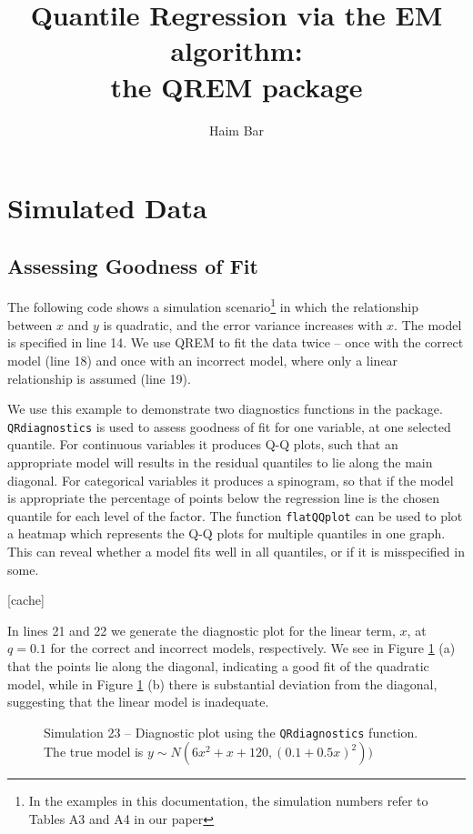 \documentclass[a4paper,10pt]{article}
\title{Quantile Regression via the EM algorithm: \\the QREM package}
\author{Haim Bar}
\begin{document}
\maketitle

\section{Simulated Data}
\subsection{Assessing Goodness of Fit}
The following code shows a simulation scenario\footnote{In the examples in this documentation, the simulation numbers refer to Tables A3 and A4 in our paper} in which the relationship between $x$ and $y$ is quadratic, and the error variance increases with $x$. The model is specified in line 14.
We use QREM to fit the data twice -- once with the correct model (line 18) and once with an incorrect model, where only a linear relationship is assumed (line 19).
 

We use this example to demonstrate two diagnostics functions in the package. \texttt{QRdiagnostics} is used to assess goodness of fit for one variable, at one selected quantile. For continuous variables it produces Q-Q plots, such that an appropriate model will results in the residual quantiles to lie along the main diagonal. For categorical variables it produces a spinogram, so that if the model is appropriate the percentage of points below the regression line is the chosen quantile for each level of the factor.
The function \texttt{flatQQplot} can be used to plot a heatmap which represents the Q-Q plots for multiple quantiles in one graph. This can reveal whether a model fits well in all quantiles, or if it is misspecified in some.

[cache]

In lines 21 and 22 we generate the diagnostic plot for the linear term, $x$, at $q=0.1$ for the correct and incorrect models, respectively. We see in Figure \ref{sim23} (a) that the points lie along the diagonal, indicating a good fit of the quadratic model, while in Figure \ref{sim23} (b) there is substantial deviation from the diagonal, suggesting that the linear model is inadequate.

\begin{figure}[t!]
\centering
{}
\caption{Simulation 23 -- Diagnostic plot using the \texttt{QRdiagnostics} function. The true model is $y \sim N(6x^2 + x +120, (0.1+0.5x)^2))$}\label{sim23}
\end{figure}
\end{document}
